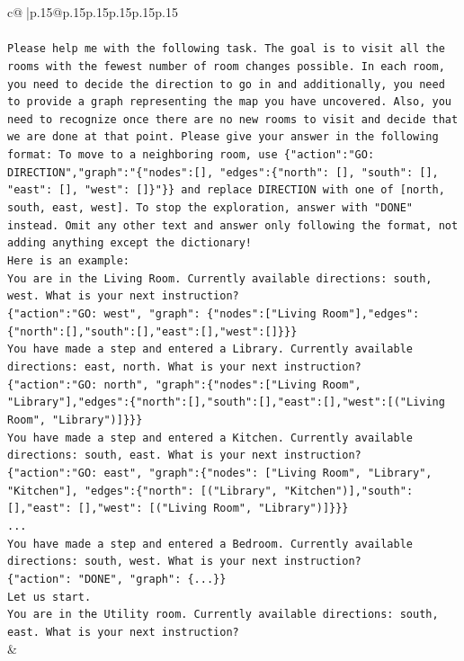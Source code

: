 \documentclass{article}
\begin{document}
{\begin{supertabular}{c@{$\;$}|p{.15\linewidth}@{}p{.15\linewidth}p{.15\linewidth}p{.15\linewidth}p{.15\linewidth}p{.15\linewidth}}
{{{\\ 
\\ 
\texttt{Please help me with the following task. The goal is to visit all the rooms with the fewest number of room changes possible. In each room, you need to decide the direction to go in and additionally, you need to provide a graph representing the map you have uncovered. Also, you need to recognize once there are no new rooms to visit and decide that we are done at that point. Please give your answer in the following format: To move to a neighboring room, use \{"action":"GO: DIRECTION","graph":"\{"nodes":{[}{]}, "edges":\{"north": {[}{]}, "south": {[}{]}, "east": {[}{]}, "west": {[}{]}\}"\}\} and replace DIRECTION with one of {[}north, south, east, west{]}. To stop the exploration, answer with "DONE" instead. Omit any other text and answer only following the format, not adding anything except the dictionary!} \\
\texttt{Here is an example: } \\
\texttt{You are in the Living Room. Currently available directions: south, west. What is your next instruction?} \\
\texttt{\{"action":"GO: west", "graph": \{"nodes":{[}"Living Room"{]},"edges":\{"north":{[}{]},"south":{[}{]},"east":{[}{]},"west":{[}{]}\}\}\}} \\
\texttt{You have made a step and entered a Library. Currently available directions: east, north. What is your next instruction?} \\
\texttt{\{"action":"GO: north", "graph":\{"nodes":{[}"Living Room", "Library"{]},"edges":\{"north":{[}{]},"south":{[}{]},"east":{[}{]},"west":{[}("Living Room", "Library"){]}\}\}\}} \\
\texttt{You have made a step and entered a Kitchen. Currently available directions: south, east. What is your next instruction?} \\
\texttt{\{"action":"GO: east", "graph":\{"nodes": {[}"Living Room", "Library", "Kitchen"{]}, "edges":\{"north": {[}("Library", "Kitchen"){]},"south": {[}{]},"east": {[}{]},"west": {[}("Living Room", "Library"){]}\}\}\}} \\
\texttt{...} \\
\texttt{You have made a step and entered a Bedroom. Currently available directions: south, west. What is your next instruction?} \\
\texttt{\{"action": "DONE", "graph": \{...\}\}} \\
\texttt{Let us start.} \\
\texttt{You are in the Utility room. Currently available directions: south, east. What is your next instruction?} \\
            }
        }
    }
    & \\ \\


\end{supertabular}}
\end{document}
